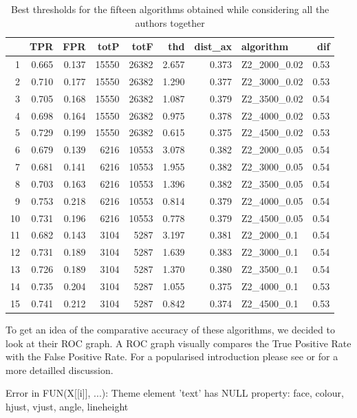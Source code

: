 \documentclass{article}\usepackage[]{graphicx}\usepackage[]{color}
\begin{document}
\begin{table}[ht]
\centering
\begin{tabular}{rrrrrrrlr}
  \hline
 & TPR & FPR & totP & totF & thd & dist\_ax & algorithm & dif \\ 
  \hline
1 & 0.665 & 0.137 & 15550 & 26382 & 2.657 & 0.373 & Z2\_2000\_0.02 & 0.53 \\ 
  2 & 0.710 & 0.177 & 15550 & 26382 & 1.290 & 0.377 & Z2\_3000\_0.02 & 0.53 \\ 
  3 & 0.705 & 0.168 & 15550 & 26382 & 1.087 & 0.379 & Z2\_3500\_0.02 & 0.54 \\ 
  4 & 0.698 & 0.164 & 15550 & 26382 & 0.975 & 0.378 & Z2\_4000\_0.02 & 0.53 \\ 
  5 & 0.729 & 0.199 & 15550 & 26382 & 0.615 & 0.375 & Z2\_4500\_0.02 & 0.53 \\ 
  6 & 0.679 & 0.139 & 6216 & 10553 & 3.078 & 0.382 & Z2\_2000\_0.05 & 0.54 \\ 
  7 & 0.681 & 0.141 & 6216 & 10553 & 1.955 & 0.382 & Z2\_3000\_0.05 & 0.54 \\ 
  8 & 0.703 & 0.163 & 6216 & 10553 & 1.396 & 0.382 & Z2\_3500\_0.05 & 0.54 \\ 
  9 & 0.753 & 0.218 & 6216 & 10553 & 0.814 & 0.379 & Z2\_4000\_0.05 & 0.54 \\ 
  10 & 0.731 & 0.196 & 6216 & 10553 & 0.778 & 0.379 & Z2\_4500\_0.05 & 0.54 \\ 
  11 & 0.682 & 0.143 & 3104 & 5287 & 3.197 & 0.381 & Z2\_2000\_0.1 & 0.54 \\ 
  12 & 0.731 & 0.189 & 3104 & 5287 & 1.639 & 0.383 & Z2\_3000\_0.1 & 0.54 \\ 
  13 & 0.726 & 0.189 & 3104 & 5287 & 1.370 & 0.380 & Z2\_3500\_0.1 & 0.54 \\ 
  14 & 0.735 & 0.204 & 3104 & 5287 & 1.055 & 0.375 & Z2\_4000\_0.1 & 0.53 \\ 
  15 & 0.741 & 0.212 & 3104 & 5287 & 0.842 & 0.374 & Z2\_4500\_0.1 & 0.53 \\ 
   \hline
\end{tabular}
\caption{Best thresholds for the fifteen algorithms obtained while considering all the authors together} 
\end{table}


To get an idea of the comparative accuracy of these algorithms, we decided to look at their ROC graph. A ROC graph visually compares the True Positive Rate with the False Positive Rate. For a popularised introduction please see \autocite{Swets2008} or \autocite{Fawcett2006} for a more detailled discussion.
\begin{Schunk}
\begin{Soutput}
Error in FUN(X[[i]], ...): Theme element 'text' has NULL property: face, colour, hjust, vjust, angle, lineheight
\end{Soutput}
\end{Schunk}
\end{document}
